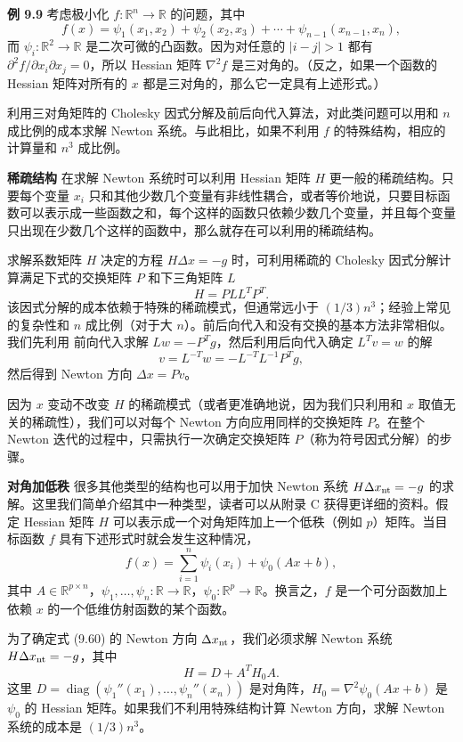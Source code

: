\documentclass[UTF8, 12pt, fontset=fandol, oneside]{ctexart}
\begin{document}
\noindent\textbf{例 9.9}\quad
考虑极小化 $f:\mathbb{R}^n\to\mathbb{R}$ 的问题，其中
\[
f(x)=\psi_1(x_1,x_2)+\psi_2(x_2,x_3)+\cdots+\psi_{n-1}(x_{n-1},x_n),
\]
而 $\psi_i:\mathbb{R}^2\to\mathbb{R}$ 是二次可微的凸函数。因为对任意的 $|i-j|>1$ 都有 $\partial^2 f/\partial x_i\partial x_j=0$，所以 Hessian 矩阵 $\nabla^2 f$ 是三对角的。（反之，如果一个函数的 Hessian 矩阵对所有的 $x$ 都是三对角的，那么它一定具有上述形式。）

利用三对角矩阵的 Cholesky 因式分解及前后向代入算法，对此类问题可以用和 $n$ 成比例的成本求解 Newton 系统。与此相比，如果不利用 $f$ 的特殊结构，相应的计算量和 $n^3$ 成比例。

\noindent\textbf{稀疏结构}\quad
在求解 Newton 系统时可以利用 Hessian 矩阵 $H$ 更一般的稀疏结构。只要每个变量 $x_i$ 只和其他少数几个变量有非线性耦合，或者等价地说，只要目标函数可以表示成一些函数之和，每个这样的函数只依赖少数几个变量，并且每个变量只出现在少数几个这样的函数中，那么就存在可以利用的稀疏结构。

求解系数矩阵 $H$ 决定的方程 $H\Delta x=-g$ 时，可利用稀疏的 Cholesky 因式分解计算满足下式的交换矩阵 $P$ 和下三角矩阵 $L$
\[
H=PLL^TP^T.
\]
该因式分解的成本依赖于特殊的稀疏模式，但通常远小于 $(1/3)n^3$；经验上常见的复杂性和 $n$ 成比例（对于大 $n$）。前后向代入和没有交换的基本方法非常相似。我们先利用
前向代入求解 $Lw=-P^Tg$，然后利用后向代入确定 $L^Tv=w$ 的解
\[
v=L^{-T}w=-L^{-T}L^{-1}P^Tg,
\]
然后得到 Newton 方向 $\Delta x=Pv$。

因为 $x$ 变动不改变 $H$ 的稀疏模式（或者更准确地说，因为我们只利用和 $x$ 取值无关的稀疏性），我们可以对每个 Newton 方向应用同样的交换矩阵 $P$。在整个 Newton 迭代的过程中，只需执行一次确定交换矩阵 $P$（称为符号因式分解）的步骤。

\noindent\textbf{对角加低秩}\quad
很多其他类型的结构也可以用于加快 Newton 系统 $H\Delta x_{\rm nt}=-g$ 的求解。这里我们简单介绍其中一种类型，读者可以从附录 C 获得更详细的资料。假定 Hessian 矩阵 $H$ 可以表示成一个对角矩阵加上一个低秩（例如 $p$）矩阵。当目标函数 $f$ 具有下述形式时就会发生这种情况，
\begin{equation}
f(x)=\sum_{i=1}^n\psi_i(x_i)+\psi_0(Ax+b),
\tag{9.60}
\end{equation}
其中 $A\in\mathbb{R}^{p\times n}$，$\psi_1,\ldots,\psi_n:\mathbb{R}\to\mathbb{R}$，$\psi_0:\mathbb{R}^p\to\mathbb{R}$。换言之，$f$ 是一个可分函数加上依赖 $x$ 的一个低维仿射函数的某个函数。

为了确定式 (9.60) 的 Newton 方向 $\Delta x_{\rm nt}$，我们必须求解 Newton 系统 $H\Delta x_{\rm nt}=-g$，其中
\[
H=D+A^TH_0A.
\]
这里 $D=\operatorname{diag}(\psi_1''(x_1),\ldots,\psi_n''(x_n))$ 是对角阵，$H_0=\nabla^2\psi_0(Ax+b)$ 是 $\psi_0$ 的 Hessian 矩阵。如果我们不利用特殊结构计算 Newton 方向，求解 Newton 系统的成本是 $(1/3)n^3$。
\end{document}
